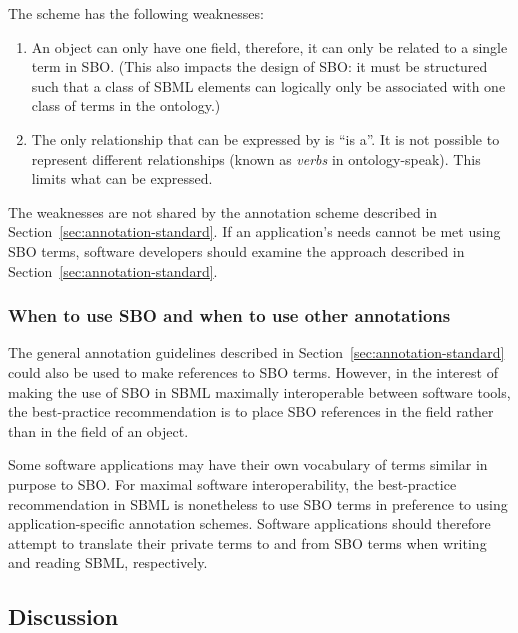 The scheme has the following weaknesses:
\begin{enumerate}

\item An object can only have one  field,
  therefore, it can only be related to a single term in SBO.
  (This also impacts the design of SBO: it must be structured such
  that a class of SBML elements can logically only be associated
  with one class of terms in the ontology.)

\item The only relationship that can be expressed by
   is ``is a''.  It is not possible to represent
  different relationships (known as \emph{verbs} in
  ontology-speak).  This limits what can be expressed.

\end{enumerate}

The weaknesses are not shared by the annotation scheme described
in Section~\ref{sec:annotation-standard}.  If an application's
needs cannot be met using SBO terms, software developers should
examine the approach described in
Section~\ref{sec:annotation-standard}.


\subsubsection{When to use SBO and when to use other annotations}

The general annotation guidelines described in
Section~\ref{sec:annotation-standard} could also be used to make
references to SBO terms.  However, in the interest of making the
use of SBO in SBML maximally interoperable between software tools,
the best-practice recommendation is to place SBO references in the
 field rather than in the  field
of an object.

Some software applications may have their own vocabulary of terms
similar in purpose to SBO.  For maximal software interoperability,
the best-practice recommendation in SBML is nonetheless to use SBO
terms in preference to using application-specific annotation
schemes.  Software applications should therefore attempt to
translate their private terms to and from SBO terms when writing
and reading SBML, respectively.


\subsection{Discussion}

